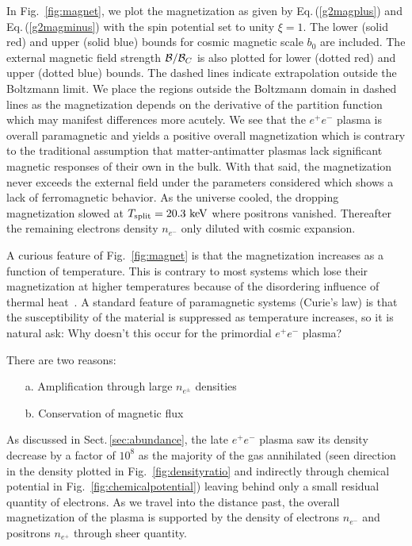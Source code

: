 \documentclass[reprint]{revtex4-2}
\newcommand*{\keV}{\text{ keV}}
\newcommand{\req}[1]{Eq.\,(\ref{#1})}
\newcommand{\rf}[1]{Fig.~{\ref{#1}}}
\newcommand{\rsec}[1]{Sect.\,{\ref{#1}}}
\begin{document}
In \rf{fig:magnet}, we plot the magnetization as given by \req{g2magplus} and \req{g2magminus} with the spin potential set to unity $\xi=1$. The lower (solid red) and upper (solid blue) bounds for cosmic magnetic scale $b_{0}$ are included. The external magnetic field strength ${\cal B}/{\cal B}_{C}$ is also plotted for lower (dotted red) and upper (dotted blue) bounds. The dashed lines indicate extrapolation outside the Boltzmann limit. We place the regions outside the Boltzmann domain in dashed lines as the magnetization depends on the derivative of the partition function which may manifest differences more acutely. We see that the $e^{+}e^{-}$ plasma is overall paramagnetic and yields a positive overall magnetization which is contrary to the traditional assumption that matter-antimatter plasmas lack significant magnetic responses of their own in the bulk. With that said, the magnetization never exceeds the external field under the parameters considered which shows a lack of ferromagnetic behavior. As the universe cooled, the dropping magnetization slowed at $T_{\rm split}=20.3\keV$ where positrons vanished. Thereafter the remaining electrons density $n_{e^{-}}$ only diluted with cosmic expansion.

A curious feature of \rf{fig:magnet} is that the magnetization increases as a function of temperature. This is contrary to most systems which lose their magnetization at higher temperatures because of the disordering influence of thermal heat~\cite{huang1991statistical}. A standard feature of paramagnetic systems (Curie's law) is that the susceptibility of the material is suppressed as temperature increases, so it is natural ask: Why doesn't this occur for the primordial $e^{+}e^{-}$ plasma?

There are two reasons:
\begin{itemize}
    \item[a.] Amplification through large $n_{e^{\pm}}$ densities
    \item[b.] Conservation of magnetic flux
\end{itemize}

As discussed in \rsec{sec:abundance}, the late $e^{+}e^{-}$ plasma saw its density decrease by a factor of $10^{8}$ as the majority of the gas annihilated (seen direction in the density plotted in \rf{fig:densityratio} and indirectly through chemical potential in \rf{fig:chemicalpotential}) leaving behind only a small residual quantity of electrons. As we travel into the distance past, the overall magnetization of the plasma is supported by the density of electrons $n_{e^{-}}$ and positrons $n_{e^{+}}$ through sheer quantity.
\end{document}
